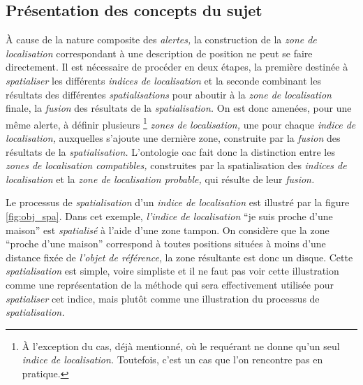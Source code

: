 \subsection{Présentation des concepts du sujet}
\label{subsec:2-2}



À cause de la nature composite des \emph{alertes,} la construction de
la \emph{zone de localisation} correspondant à une description de
position ne peut se faire directement. Il est nécessaire de procéder
en deux étapes, la première destinée à \emph{spatialiser} les
différents \emph{indices de localisation} et la seconde combinant les
résultats des différentes \emph{spatialisations} pour aboutir à la
\emph{zone de localisation} finale, \ie la \emph{fusion} des résultats
de la \emph{spatialisation.} On est donc amenées, pour une même
alerte, à définir plusieurs \footnote{À l'exception du cas, déjà
  mentionné, où le requérant ne donne qu'un seul \emph{indice de
    localisation.}  Toutefois, c'est un cas que l'on rencontre pas en
  pratique.}  \emph{zones de localisation,} une pour chaque
\emph{indice de localisation,} auxquelles s'ajoute une dernière zone,
construite par la \emph{fusion} des résultats de la
\emph{spatialisation.}  L'ontologie \ac{oac} \autocite{Viry2019} fait
donc la distinction entre les \emph{zones de localisation
  compatibles,} construites par la spatialisation des \emph{indices de
  localisation} et la \emph{zone de localisation probable,} qui
résulte de leur \emph{fusion.}

Le processus de \emph{spatialisation} d'un \emph{indice de
  localisation} est illustré par la figure \ref{fig:obj_spa}. Dans cet
exemple, \emph{l'indice de localisation} \enquote{je suis proche d'une
  maison} est \emph{spatialisé} à l'aide d'une zone tampon. On
considère que la zone \enquote{proche d'une maison} correspond à
toutes positions situées à moins d'une distance fixée de \emph{l'objet
  de référence}, la zone résultante est donc un disque. Cette
\emph{spatialisation} est simple, voire simpliste et il ne faut pas
voir cette illustration comme une représentation de la méthode qui
sera effectivement utilisée pour \emph{spatialiser} cet indice, mais
plutôt comme une illustration du processus de \emph{spatialisation.}

